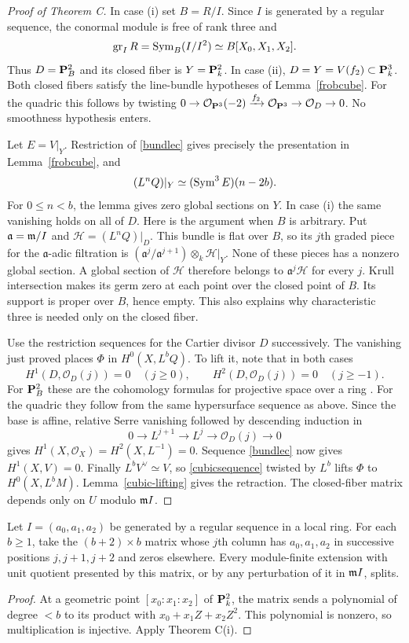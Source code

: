 \begin{proof}[Proof of Theorem C]
In case (i) set $B=R/I$. Since $I$ is generated by a regular sequence, the conormal module is free of rank three and
\[
 \operatorname{gr}_I R=\operatorname{Sym}_B(I/I^2)\simeq B[X_0,X_1,X_2].
\]
Thus $D=\mathbf P^2_B$ and its closed fiber is $Y=\mathbf P^2_k$. In case (ii), $D=Y=V(f_2)\subset\mathbf P^3_k$. Both closed fibers satisfy the line-bundle hypotheses of Lemma~\ref{frobcube}. For the quadric this follows by twisting $0\to\mathcal O_{\mathbf P^3}(-2)\xrightarrow{f_2}\mathcal O_{\mathbf P^3}\to\mathcal O_D\to0$. No smoothness hypothesis enters.

Let $E=V|_Y$. Restriction of \eqref{bundlec} gives precisely the presentation in Lemma~\ref{frobcube}, and
\[
 (L^n Q)|_Y\simeq (\operatorname{Sym}^3 E)(n-2b).
\]
For $0\le n<b$, the lemma gives zero global sections on $Y$. In case (i) the same vanishing holds on all of $D$. Here is the argument when $B$ is arbitrary. Put $\mathfrak a=\mathfrak m/I$ and $\mathcal H=(L^nQ)|_D$. This bundle is flat over $B$, so its $j$th graded piece for the $\mathfrak a$-adic filtration is
$(\mathfrak a^j/\mathfrak a^{j+1})\otimes_k\mathcal H|_Y$. None of these pieces has a nonzero global section. A global section of $\mathcal H$ therefore belongs to $\mathfrak a^j\mathcal H$ for every $j$. Krull intersection makes its germ zero at each point over the closed point of $B$. Its support is proper over $B$, hence empty. This also explains why characteristic three is needed only on the closed fiber.

Use the restriction sequences for the Cartier divisor $D$ successively. The vanishing just proved places $\Phi$ in $H^0(X,L^bQ)$. To lift it, note that in both cases
\[
 H^1(D,\mathcal O_D(j))=0\quad(j\ge0),\qquad
 H^2(D,\mathcal O_D(j))=0\quad(j\ge-1).
\]
For $\mathbf P^2_B$ these are the cohomology formulas for projective space over a ring \cite{Stacks}. For the quadric they follow from the same hypersurface sequence as above. Since the base is affine, relative Serre vanishing followed by descending induction in
\[
 0\longrightarrow L^{j+1}\longrightarrow L^j
       \longrightarrow\mathcal O_D(j)\longrightarrow0
\]
gives $H^1(X,\mathcal O_X)=H^2(X,L^{-1})=0$. Sequence \eqref{bundlec} now gives $H^1(X,V)=0$. Finally $L^b V^\vee\simeq V$, so \eqref{cubicsequence} twisted by $L^b$ lifts $\Phi$ to $H^0(X,L^bM)$. Lemma~\ref{cubic-lifting} gives the retraction. The closed-fiber matrix depends only on $U$ modulo $\mathfrak m I$.
\end{proof}

\begin{corollary}\label{toeplitz}
Let $I=(a_0,a_1,a_2)$ be generated by a regular sequence in a local ring. For each $b\ge1$, take the $(b+2)\times b$ matrix whose $j$th column has $a_0,a_1,a_2$ in successive positions $j,j+1,j+2$ and zeros elsewhere. Every module-finite extension with unit quotient presented by this matrix, or by any perturbation of it in $\mathfrak m I$, splits.
\end{corollary}
\begin{proof}
At a geometric point $[x_0:x_1:x_2]$ of $\mathbf P^2_k$, the matrix sends a polynomial of degree $<b$ to its product with $x_0+x_1 Z+x_2 Z^2$. This polynomial is nonzero, so multiplication is injective. Apply Theorem C(i).
\end{proof}


